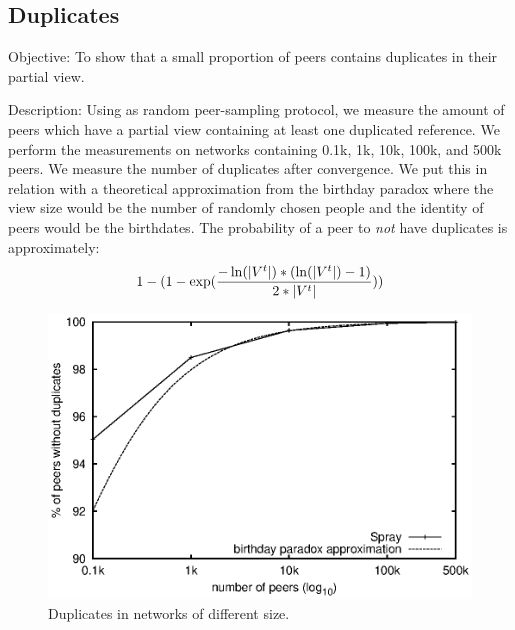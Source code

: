 \subsection{Duplicates}

\begin{asparadesc} 
\item[Objective:] To show that a small proportion of peers contains duplicates
  in their partial view.
\item[Description:] Using \SPRAY as random peer-sampling protocol, we measure
  the amount of peers which have a partial view containing at least one
  duplicated reference. We perform the measurements on networks containing 0.1k,
  1k, 10k, 100k, and 500k peers. We measure the number of duplicates after
  convergence. We put this in relation with a theoretical approximation from the
  birthday paradox where the view size would be the number of randomly chosen
  people and the identity of peers would be the birthdates. The probability of a
  peer to \emph{not} have duplicates is approximately:
  \begin{equation*}
    1- 
    (1-
    \exp({-\ln(|V^t|)*(\ln(|V^t|)-1)\over{2*|V^t|}}))
  \end{equation*}

\begin{figure}
  \centering
  \includegraphics[width=\SCALE\textwidth]{img/duplicates.eps}
  \caption{\label{fig:duplicates}Duplicates in networks of different size.}
\end{figure}



\end{asparadesc}
